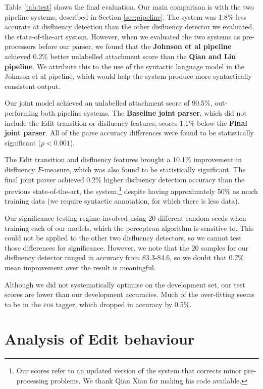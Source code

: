 \documentclass[11pt,letterpaper]{article}
\begin{document}
Table \ref{tab:test} shows the final evaluation.  
Our main comparison is with the two pipeline systems, described in Section
\ref{sec:pipeline}.  The \citet{Johnson04a} system was 1.8\% less
accurate at disfluency detection than the other disfluency detector we evaluated,
the state-of-the-art \citet{qian:13} system.  However, when we evaluated the two
systems as pre-processors before our parser, we found that the
\textbf{Johnson et al pipeline} achieved 0.2\% better unlabelled attachment score
than the \textbf{Qian and Liu pipeline}.  We attribute this to the use of the
\citet{Charniak01a} syntactic language model in the Johnson et al pipeline, which
would help the system produce more syntactically consistent output.

Our joint model achieved an unlabelled attachment score of 90.5\%, out-performing
both pipeline systems.  The \textbf{Baseline joint parser}, which did not include
the Edit transition or disfluency features, scores 1.1\% below the
\textbf{Final joint parser}.  All of the parse accuracy differences were found to
be statistically significant ($p<0.001$).

The Edit transition and disfluency features brought a 10.1\% improvement
in disfluency $F$-measure, which was also found to be statistically significant.
The final joint parser achieved 0.2\% higher disfluency detection accuracy than
the previous state-of-the-art, the \citet{qian:13} system,\footnote{
Our scores refer to an updated version of the system
that corrects minor pre-processing problems. We thank Qian Xian for making
his code available.} despite having approximately 50\%
as much training data (we require syntactic annotation, for which there is
less data).

Our significance testing regime involved using 20 different random seeds when
training each of our models, which the perceptron algorithm is sensitive to.
This could not be applied to the other two disfluency detectors, so we cannot
test those differences for significance.  However, we note that the 20 samples
for our disfluency detector ranged in accuracy from 83.3-84.6, so we doubt
that 0.2\% mean improvement over the \citet{qian:13} result is meaningful.

Although we did not systematically
optimise on the development set, our test scores are lower than our development
accuracies. Much of the over-fitting seems to be in the \textsc{pos} tagger,
which dropped in accuracy by 0.5\%.

\section{Analysis of Edit behaviour}
\end{document}
